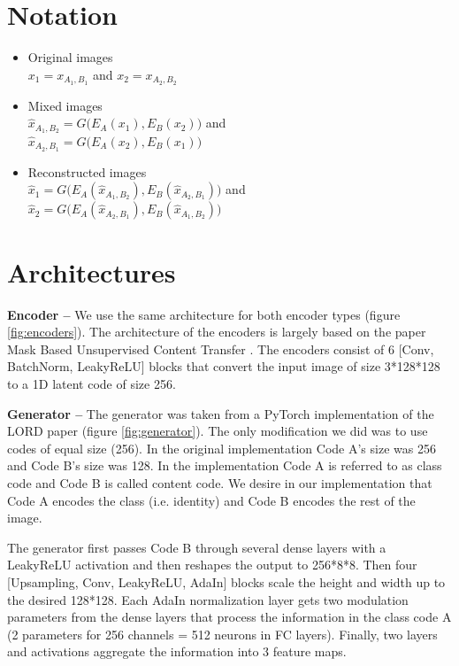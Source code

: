 \documentclass{article}
\begin{document}
\begin{multicols}{2}

\section{Notation}

\begin{itemize}
	\item Original images \\$x_1 = x_{A_1,B_1}$ and $x_2 = x_{A_2,B_2}$
	\item Mixed images \\$\hat{x}_{A_1,B_2} = G \big (E_A(x_1), E_B(x_2) \big)$ and \\$\hat{x}_{A_2,B_1} = G \big (E_A(x_2), E_B(x_1) \big)$
	\item Reconstructed images \\$\hat{x}_1= G \big (E_A(\hat{x}_{A_1,B_2}), E_B(\hat{x}_{A_2,B_1}) \big)  $ and \\$\hat{x}_2  = G \big (E_A(\hat{x}_{A_2,B_1}), E_B(\hat{x}_{A_1,B_2}) \big)  $
\end{itemize}


\section{Architectures}

\textbf{Encoder --} We use the same architecture for both encoder types  (figure \ref{fig:encoders}). The architecture of the encoders is largely based on the paper Mask Based Unsupervised Content Transfer \cite{mokady2019mask}. The encoders consist of 6 [Conv, BatchNorm, LeakyReLU] blocks that convert the input image of size 3*128*128 to a 1D latent code of size 256. 

\textbf{Generator --} The generator was taken from a PyTorch implementation \cite{LORD} of the LORD paper \cite{gabbay2020lord} (figure \ref{fig:generator}). The only modification we did was to use codes of equal size (256). In the original implementation Code A's size was 256 and Code B's size was 128. In the implementation \cite{LORD} Code A is referred to as class code and Code B is called content code. We desire in our implementation that Code A encodes the class (i.e. identity) and Code B encodes the rest of the image. 

The generator first passes Code B through several dense layers with a LeakyReLU activation and then reshapes the output to 256*8*8. Then four [Upsampling, Conv, LeakyReLU, AdaIn] blocks scale the height and width up to the desired 128*128. Each AdaIn normalization layer \cite{huang2017arbitrary} gets two modulation parameters from the dense layers that process the information in the class code A (2 parameters for 256 channels = 512 neurons in FC layers). Finally, two layers and activations aggregate the information into 3 feature maps. 


\end{multicols}
\end{document}
